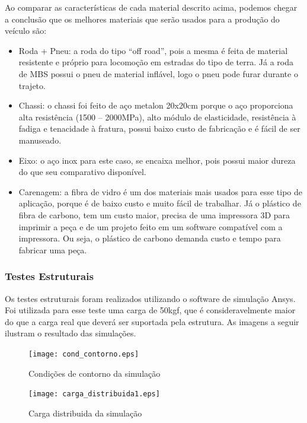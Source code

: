    \newpage

  Ao comparar as características de cada material descrito acima, podemos chegar a conclusão que os melhores materiais que
  serão usados para a produção do veículo são:

  \begin{itemize}
    \item Roda + Pneu: a roda do tipo “off road”, pois a mesma é feita de material resistente e próprio para locomoção em estradas do tipo de terra. Já a roda de MBS possui o pneu de material inflável, logo o pneu pode furar durante o trajeto.
    \item Chassi: o chassi foi feito de aço metalon 20x20cm porque o aço proporciona alta resistência (1500 – 2000MPa), alto módulo de elasticidade, resistência à fadiga e tenacidade à fratura, possui baixo custo de fabricação e é fácil de ser manuseado.
    \item Eixo: o aço inox para este caso, se encaixa melhor, pois possui maior dureza do que seu comparativo disponível.
    \item Carenagem: a fibra de vidro é um dos materiais mais usados para esse tipo de aplicação, porque é de baixo custo e muito fácil de trabalhar. Já o plástico de fibra de carbono, tem um custo maior, precisa de uma impressora 3D para imprimir a peça e de um projeto feito em um software compatível com a  impressora. Ou seja, o plástico de carbono demanda custo e tempo para fabricar uma peça.
  \end{itemize}

\subsubsection{Testes Estruturais}

Os testes estruturais foram realizados utilizando o software de simulação Ansys. Foi utilizada para esse teste uma carga de 50kgf, que é consideravelmente maior do que a carga real que deverá ser suportada pela estrutura. As imagens a seguir ilustram o resultado das simulações. 

\begin{figure}[!htbp]
	\centering
	\texttt{[image: cond\_contorno.eps]}
	\caption{Condições de contorno da simulação}
\end{figure}

\begin{figure}[!htbp]
	\centering
	\texttt{[image: carga\_distribuida1.eps]}
	\caption{Carga distribuida da simulação}
\end{figure}

